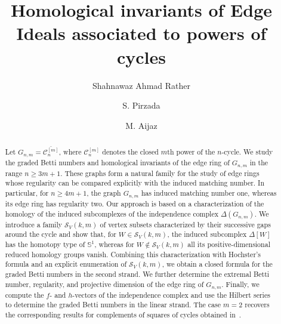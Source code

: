 \documentclass[12pt,reqno]{amsart}
\theoremstyle{definition}
\numberwithin{equation}{section}
\def\C{\mathcal{C}}
\begin{document}
\title[Complements of closed powers of cycles]
{Homological invariants of Edge Ideals associated to   powers of cycles}

	\author{Shahnawaz Ahmad Rather}
\address{Department of Mathematics \\
	Government Degree College  \\
	Baramulla \\
	Jammu and Kashmir 193101, India}

	\author{S. Pirzada}
\address{Department of Mathematics \\
	University of Kashmir, Hazratbal, \\
	Jammu and Kashmir 190006, India}
	\author{M. Aijaz}
\address{Department of Mathematics \\
	Government Degree College for Women  \\
	Baramulla \\
	Jammu and Kashmir 193101, India}


\begin{abstract}
	Let $G_{n,m}=\overline{\C_n^{[m]}}$, where $\C_n^{[m]}$ denotes the
	closed $m$th power of the $n$-cycle. We study the graded Betti numbers
	and homological invariants of the edge ring of $G_{n,m}$ in the range
	$n\geq 3m+1$. These graphs form a natural family for the study of edge rings whose
	regularity can be compared explicitly with the induced matching number.
	In particular, for $n\geq4m+1$, the graph $G_{n,m}$ has induced matching
	number one, whereas its edge ring has regularity two.
	Our approach is based on a characterization of the homology of the
	induced subcomplexes of the independence complex
	$\Delta(G_{n,m})$. We introduce a family
	$\mathcal{S}_V(k,m)$ of vertex subsets characterized by their successive
	gaps around the cycle and show that, for $W\in\mathcal{S}_V(k,m)$, the
	induced subcomplex $\Delta[W]$ has the homotopy type of $\mathbb{S}^1$,
	whereas for $W\notin\mathcal{S}_V(k,m)$ all its positive-dimensional
	reduced homology groups vanish. Combining this characterization with
	Hochster's formula and an explicit enumeration of
	$\mathcal{S}_V(k,m)$, we obtain a closed formula for the graded Betti
	numbers in the second strand. We further determine the extremal Betti
	number, regularity, and projective dimension of the edge ring of $G_{n,m}$. Finally, we
	compute the $f$- and $h$-vectors of the independence complex and use
	the Hilbert series to determine the graded Betti numbers in the linear
	strand. The case $m=2$ recovers the corresponding results for complements of
	squares of cycles obtained in~\cite{RatherSquare}.
\end{abstract}
\end{document}
